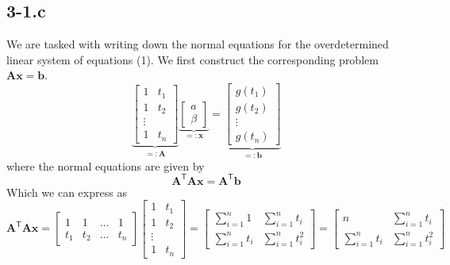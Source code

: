 \documentclass{article}
\begin{document}
\subsection*{3-1.c}
We are tasked with writing down the normal equations for the overdetermined linear system of equations (1). We first construct the corresponding problem $\mathbf{A}\mathbf{x} = \mathbf{b}$.
\begin{equation*}
    \underbrace{\begin{bmatrix}
    1 & t_{1} \\
    1 & t_{2} \\
    \vdots \\
    1 & t_{n}
    \end{bmatrix}}_{=:\mathbf{A}}
    \underbrace{\begin{bmatrix}
        a \\ \beta
    \end{bmatrix}}_{=: \mathbf{x}}
    =
    \underbrace{\begin{bmatrix}
        g\left(t_{1}\right) \\
        g\left(t_{2}\right) \\
        \vdots \\
        g\left(t_{n}\right)
    \end{bmatrix}}_{=:\mathbf{b}}
\end{equation*}
where the normal equations are given by
\begin{equation*}
    \mathbf{A}^{\mathsf{T}}\mathbf{A}\mathbf{x} = \mathbf{A}^{\mathsf{T}}\mathbf{b}
\end{equation*}
Which we can express as
\begin{equation*}
\mathbf{A}^{\mathsf{T}}\mathbf{A}\mathbf{x} = 
\begin{bmatrix}
    1 & 1 & \dots & 1 \\
    t_{1} & t_{2} & \dots & t_{n}
\end{bmatrix}
    \begin{bmatrix}
    1 & t_{1} \\
    1 & t_{2} \\
    \vdots \\
    1 & t_{n}
    \end{bmatrix}
    = \begin{bmatrix}
        \sum_{i=1}^{n}1 & \sum_{i=1}^{n}t_{i} \\
        \sum_{i=1}^{n}t_{i} & \sum_{i=1}^{n}t_{i}^{2}
    \end{bmatrix} =
    \begin{bmatrix}
        n & \sum_{i=1}^{n}t_{i} \\
        \sum_{i=1}^{n}t_{i} & \sum_{i=1}^{n}t_{i}^{2}
    \end{bmatrix}
\end{equation*}
\end{document}
